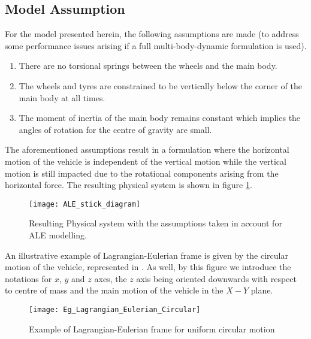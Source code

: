 \subsection{Model Assumption}
\label{sec:ALEModelAssumption}
For the model presented herein, the following assumptions are made (to address some performance issues arising if a full multi-body-dynamic formulation is used).
\begin{enumerate}
    \item There are no torsional springs between the wheels and the main body.
    \item The wheels and tyres are constrained to be vertically below the corner of the main body at all times.
    \item The moment of inertia of the main body remains constant which implies the angles of rotation for the centre of gravity are small.
\end{enumerate}
The aforementioned assumptions result in a formulation where the horizontal motion of the vehicle is independent of the vertical motion while the vertical motion is still impacted due to the rotational components arising from the horizontal force. The resulting physical system is shown in figure \ref{fig:ALEstick}. 
\begin{figure}[!ht]
    \centering
    \texttt{[image: ALE\_stick\_diagram]}
    \caption{Resulting Physical system with the assumptions taken in account for ALE modelling.}
    \label{fig:ALEstick}
\end{figure}

\noindent An illustrative example of Lagrangian-Eulerian frame is given by the circular motion of the vehicle, represented in . As well, by this figure we introduce the notations for $x$, $y$ and $z$ axes, the $z$ axis being oriented downwards with respect to centre of mass and the main motion of the vehicle in the $X-Y$ plane. 

\begin{figure}[!ht]
    \centering
    \texttt{[image: Eg\_Lagrangian\_Eulerian\_Circular]}
    \caption{Example of Lagrangian-Eulerian frame for uniform circular motion}
    \label{fig:Eg_Lagrangian_Eulerian_Circular}
\end{figure}

